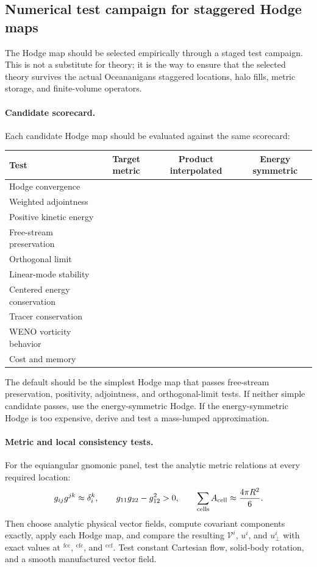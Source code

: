 \documentclass[11pt]{article}
\newcommand{\mc}[1]{\mathcal{#1}}
\newcommand{\Vflux}{\mc{V}}
\newcommand{\loc}[1]{^{\mathrm{#1}}}
\begin{document}
\subsection{Numerical test campaign for staggered Hodge maps}
\label{subsec:hodge-test-campaign}

The Hodge map should be selected empirically through a staged test campaign.  This is not a substitute for theory; it is the way to ensure that the selected theory survives the actual Oceananigans staggered locations, halo fills, metric storage, and finite-volume operators.

\paragraph{Candidate scorecard.}
Each candidate Hodge map should be evaluated against the same scorecard:
\begin{center}
\begin{tabular}{lccc}
\toprule
Test & Target metric & Product interpolated & Energy symmetric \\
\midrule
Hodge convergence & & & \\
Weighted adjointness & & & \\
Positive kinetic energy & & & \\
Free-stream preservation & & & \\
Orthogonal limit & & & \\
Linear-mode stability & & & \\
Centered energy conservation & & & \\
Tracer conservation & & & \\
WENO vorticity behavior & & & \\
Cost and memory & & & \\
\bottomrule
\end{tabular}
\end{center}
The default should be the simplest Hodge map that passes free-stream preservation, positivity, adjointness, and orthogonal-limit tests.  If neither simple candidate passes, use the energy-symmetric Hodge.  If the energy-symmetric Hodge is too expensive, derive and test a mass-lumped approximation.

\paragraph{Metric and local consistency tests.}
For the equiangular gnomonic panel, test the analytic metric relations at every required location:
\begin{equation}
  g_{ij}g^{jk}\approx\delta_i^k,
  \qquad
  g_{11}g_{22}-g_{12}^2>0,
  \qquad
  \sum_{\rm cells} A_{\rm cell}\approx \frac{4\pi R^2}{6}.
\end{equation}
Then choose analytic physical vector fields, compute covariant components exactly, apply each Hodge map, and compare the resulting \(\Vflux^i\), \(u^i\), and \(u_\perp^i\) with exact values at \(\loc{fcc}\), \(\loc{cfc}\), and \(\loc{ccf}\).  Test constant Cartesian flow, solid-body rotation, and a smooth manufactured vector field.
\end{document}
